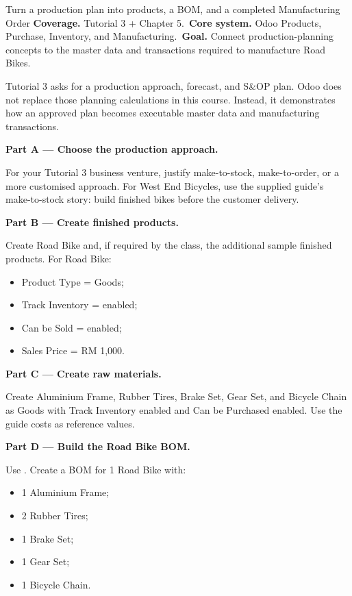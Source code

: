 
\begin{labproject}{Turn a production plan into products, a BOM, and a completed Manufacturing Order}
\textbf{Coverage.} Tutorial 3 + Chapter 5.\
\textbf{Core system.} Odoo Products, Purchase, Inventory, and Manufacturing.\
\textbf{Goal.} Connect production-planning concepts to the master data and transactions required to manufacture Road Bikes.

\begin{labmode}
Tutorial 3 asks for a production approach, forecast, and S\&OP plan. Odoo does not replace those planning calculations in this course. Instead, it demonstrates how an approved plan becomes executable master data and manufacturing transactions.
\end{labmode}

\medskip\noindent\textbf{Part A --- Choose the production approach.}

For your Tutorial 3 business venture, justify make-to-stock, make-to-order, or a more customised approach. For West End Bicycles, use the supplied guide's make-to-stock story: build finished bikes before the customer delivery.

\medskip\noindent\textbf{Part B --- Create finished products.}

Create Road Bike and, if required by the class, the additional sample finished products. For Road Bike:
\begin{itemize}
  \item Product Type = Goods;
  \item Track Inventory = enabled;
  \item Can be Sold = enabled;
  \item Sales Price = RM 1,000.
\end{itemize}

\medskip\noindent\textbf{Part C --- Create raw materials.}

Create Aluminium Frame, Rubber Tires, Brake Set, Gear Set, and Bicycle Chain as Goods with Track Inventory enabled and Can be Purchased enabled. Use the guide costs as reference values.

\medskip\noindent\textbf{Part D --- Build the Road Bike BOM.}

Use . Create a BOM for 1 Road Bike with:
\begin{itemize}
  \item 1 Aluminium Frame;
  \item 2 Rubber Tires;
  \item 1 Brake Set;
  \item 1 Gear Set;
  \item 1 Bicycle Chain.
\end{itemize}


\end{labproject}
